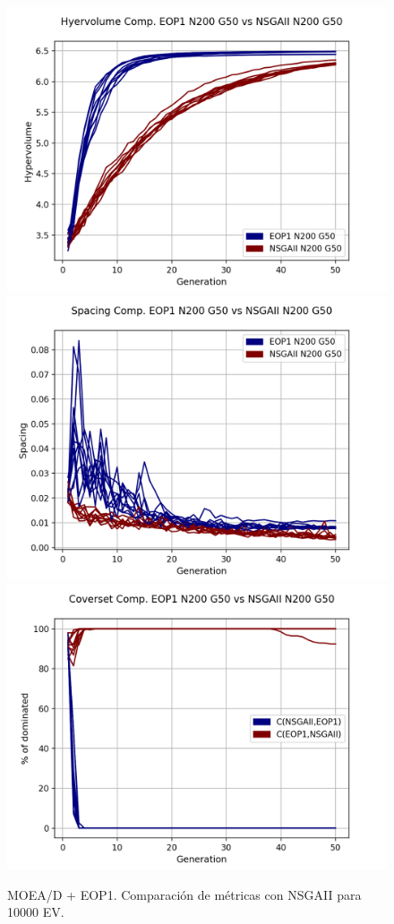 \begin{figure}[H]
\includegraphics[scale=0.35]{../METRICS_PLOTS/Hypervol_COMP_EOP1N200G50_NSGAIIN200G50.png}
\includegraphics[scale=0.35]{../METRICS_PLOTS/Spacing_COMP_EOP1N200G50_NSGAIIN200G50.png}
\includegraphics[scale=0.35]{../METRICS_PLOTS/CoverSet_COMP_EOP1N200G50_NSGAIIN200G50.png}\\
\caption{MOEA/D + EOP1. Comparación de métricas con NSGAII para 10000 EV.}
\label{fig:7}
\end{figure}

